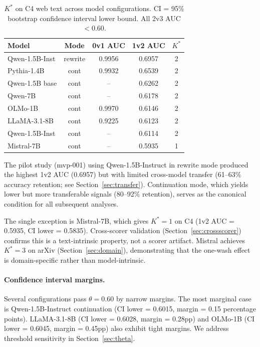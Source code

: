 \documentclass[11pt,a4paper]{article}
\begin{document}
\begin{table}[t]
\centering
\caption{$K^*$ on C4 web text across model configurations. CI = 95\% bootstrap confidence interval lower bound. All 2v3 AUC $< 0.60$.}
\label{tab:kstar_c4}
\small
\begin{tabular}{lcccc}
\toprule
Model & Mode & 0v1 AUC & 1v2 AUC & $K^*$ \\
\midrule
Qwen-1.5B-Inst & rewrite & 0.9956 & 0.6957 & 2 \\
Pythia-1.4B & cont & 0.9932 & 0.6539 & 2 \\
Qwen-1.5B base & cont & -- & 0.6262 & 2 \\
Qwen-7B & cont & -- & 0.6178 & 2 \\
OLMo-1B & cont & 0.9970 & 0.6146 & 2 \\
LLaMA-3.1-8B & cont & 0.9225 & 0.6123 & 2 \\
Qwen-1.5B-Inst & cont & -- & 0.6114 & 2 \\
\midrule
Mistral-7B & cont & -- & 0.5935 & 1 \\
\bottomrule
\end{tabular}
\end{table}

The pilot study (mvp-001) using Qwen-1.5B-Instruct in rewrite mode produced the highest 1v2 AUC (0.6957) but with limited cross-model transfer (61--63\% accuracy retention; see Section~\ref{sec:transfer}). Continuation mode, which yields lower but more transferable signals (80--92\% retention), serves as the canonical condition for all subsequent analyses.

The single exception is Mistral-7B, which gives $K^*=1$ on C4 (1v2 AUC = 0.5935, CI lower = 0.5835). Cross-scorer validation (Section~\ref{sec:crossscorer}) confirms this is a text-intrinsic property, not a scorer artifact. Mistral achieves $K^*=3$ on arXiv (Section~\ref{sec:domain}), demonstrating that the one-wash effect is domain-specific rather than model-intrinsic.

\paragraph{Confidence interval margins.}
Several configurations pass $\theta = 0.60$ by narrow margins. The most marginal case is Qwen-1.5B-Instruct continuation (CI lower = 0.6015, margin = 0.15 percentage points). LLaMA-3.1-8B (CI lower = 0.6028, margin = 0.28pp) and OLMo-1B (CI lower = 0.6045, margin = 0.45pp) also exhibit tight margins. We address threshold sensitivity in Section~\ref{sec:theta}.
\end{document}
